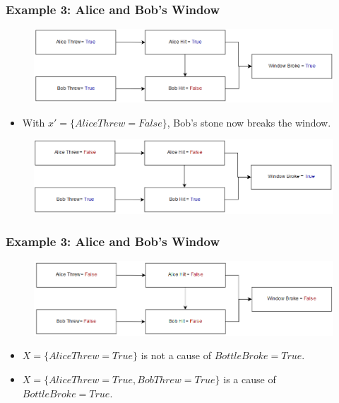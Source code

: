 \documentclass{beamer}
\theoremstyle{plain}
\theoremstyle{definition}
\begin{document}
\begin{frame}
\frametitle{Example 3: Alice and Bob's Window}
\begin{figure}
\includegraphics[scale=.4]{alicebobModelReal}
\end{figure}

\begin{itemize}
\item With $x' = \{ Alice Threw = False\}$, Bob's stone now breaks the window.
\end{itemize}
\begin{figure}
\includegraphics[scale=.4]{alicebobModelCounterfactual}
\end{figure}
\end{frame}

\begin{frame}
\frametitle{Example 3: Alice and Bob's Window}
\begin{figure}
\includegraphics[scale=.4]{alicebobModelCounterfactual2}
\end{figure}

\begin{itemize}
\item $X = \{Alice Threw = True\}$ is not a cause of $Bottle Broke = True$.
\item $X = \{Alice Threw = True, Bob Threw = True\}$ is a cause of $Bottle Broke = True$.
\end{itemize}
\end{frame}
\end{document}

